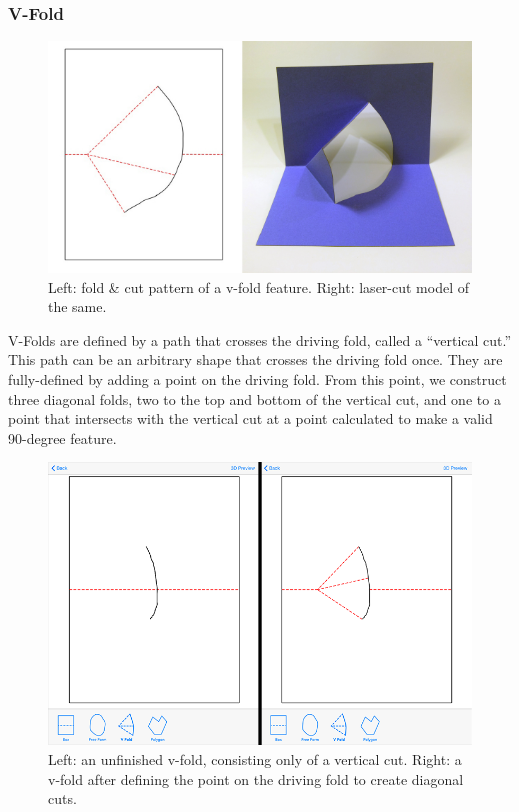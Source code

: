 \subsubsection{V-Fold}\label{v-fold}

\begin{figure}[htbp]
\centering
\includegraphics{figures/33_UI_Interface_Data_Structures/v.pdf}
\caption{Left: fold \& cut pattern of a v-fold feature. Right: laser-cut
model of the same.}
\end{figure}

V-Folds are defined by a path that crosses the driving fold, called a
``vertical cut.'' This path can be an arbitrary shape that crosses the
driving fold once. They are fully-defined by adding a point on the
driving fold. From this point, we construct three diagonal folds, two to
the top and bottom of the vertical cut, and one to a point that
intersects with the vertical cut at a point calculated to make a valid
90-degree feature.

\begin{figure}[htbp]
\centering
\includegraphics{figures/33_UI_Interface_Data_Structures/vfold_before_after.png}
\caption{Left: an unfinished v-fold, consisting only of a vertical cut.
Right: a v-fold after defining the point on the driving fold to create
diagonal cuts.}
\end{figure}

